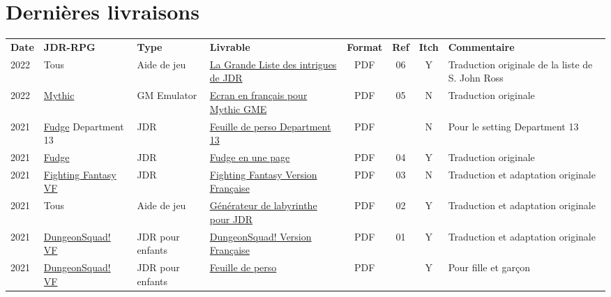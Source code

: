 \documentclass[a4paper, 11pt, twoside]{article}
\begin{document}
\section{Dernières livraisons}
\label{sec:orgc03b07b}
\begin{longtable}{p{0.5cm}p{2cm}p{1.5cm}p{4cm}cccp{4cm}}
\textbf{Date} & \textbf{JDR-RPG} & \textbf{Type} & \textbf{Livrable} & \textbf{Format} & \textbf{Ref} & \textbf{Itch} & \textbf{Commentaire}\\
2022 & Tous & Aide de jeu & \href{https://rouboudou.itch.io/la-grande-liste-des-intrigues-de-jdr}{La Grande Liste des intrigues de JDR} & PDF & 06 & Y & Traduction originale de la liste de S. John Ross\\
2022 & \href{https://github.com/orey/jdr/tree/master/Mythic-fr}{Mythic} & GM Emulator & \href{https://github.com/orey/jdr/blob/master/Mythic-fr/MythicGME-EcranMJ-VersionFrancaise-OreyJdr05.pdf}{Ecran en français pour Mythic GME} & PDF & 05 & N & Traduction originale\\
2021 & \href{https://github.com/orey/jdr/tree/master/Fudge-fr}{Fudge} Department 13 & JDR & \href{https://github.com/orey/jdr/blob/master/Fudge-fr/Division13/Department13-FeuillePerso.pdf}{Feuille de perso Department 13} & PDF &  & N & Pour le setting Department 13\\
2021 & \href{https://github.com/orey/jdr-fudge}{Fudge} & JDR & \href{https://rouboudou.itch.io/fudge}{Fudge en une page} & PDF & 04 & Y & Traduction originale\\
2021 & \href{https://github.com/orey/jdr/tree/master/FightingFantasys-fr}{Fighting Fantasy VF} & JDR & \href{https://github.com/orey/jdr/blob/master/FightingFantasys-fr/FightingFantasy-VersionFrancaise-OreyJdr03.pdf}{Fighting Fantasy Version Française} & PDF & 03 & N & Traduction et adaptation originale\\
2021 & Tous & Aide de jeu & \href{https://rouboudou.itch.io/dungeonsquad-fr}{Générateur de labyrinthe pour JDR} & PDF & 02 & Y & Traduction et adaptation originale\\
2021 & \href{https://github.com/orey/jdr-dungeon-squad-fr}{DungeonSquad! VF} & JDR pour enfants & \href{https://rouboudou.itch.io/dungeonsquad-fr}{DungeonSquad! Version Française} & PDF & 01 & Y & Traduction et adaptation originale\\
2021 & \href{https://github.com/orey/jdr-dungeon-squad-fr}{DungeonSquad! VF} & JDR pour enfants & \href{https://rouboudou.itch.io/dungeonsquad-fr}{Feuille de perso} & PDF &  & Y & Pour fille et garçon\\

\end{longtable}
\end{document}
